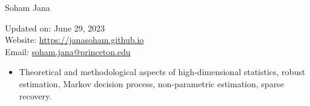 \documentclass[letterpaper,11pt,oneside]{article}
\theoremstyle{definition}
\begin{document}
	
	
	\noindent  \Huge{Soham Jana} \\
	\vspace{1ex} 
	\normalsize
	
	\hfill
	\begin{minipage}{2.6in}
	Updated on: June 29, 2023 \\
	Website: \href{https://janasoham.github.io/}{https://janasoham.github.io}\\
	Email: \href{mailto:soham.jana@princeton.edu}{soham.jana@princeton.edu}
	\end{minipage}
	\vspace{1cm}
	
	
	
	
	
	
	\begin{itemize}
		\item[] Theoretical and methodological aspects of high-dimensional statistics, robust estimation, Markov decision process, non-parametric estimation, sparse recovery.
	\end{itemize}

	
\end{document}
